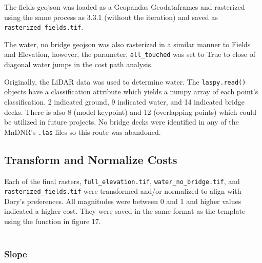 \documentclass[article,12pt]{article}
\numberwithin{equation}{section}
\begin{document}
The fields geojson was loaded as a Geopandas Geodataframes and rasterized using the same process as 3.3.1 (without the iteration) and saved as \texttt{rasterized\_fields.tif}.

The water, no bridge geojson was also rasterized in a similar manner to Fields and Elevation, however, the parameter, \texttt{all\_touched} was set to True to close of diagonal water jumps in the cost path analysis.

Originally, the LiDAR data was used to determine water. The \texttt{laspy.read()} objects have a classification attribute which yields a numpy array of each point's classification. 2 indicated ground, 9 indicated water, and 14 indicated bridge decks. There is also 8 (model keypoint) and 12 (overlapping points) which could be utilized in future projects. No bridge decks were identified in any of the MnDNR's \texttt{.las} files so this route was abandoned.

\subsection{Transform and Normalize Costs}
\begin{adjustwidth}{0in}{-.8in}
	\begin{multicols}{2}
Each of the final rasters, \texttt{full\_elevation.tif}, \texttt{water\_no\_bridge.tif}, and \texttt{rasterized\_fields.tif} were transformed and/or normalized to align with Dory's preferences. All magnitudes were between 0 and 1 and higher values indicated a higher cost. They were saved in the same format as the template using the function in figure 17.\\ 

~\columnbreak
{}

	\end{multicols}
\end{adjustwidth}
\subsubsection{Slope}
\end{document}

